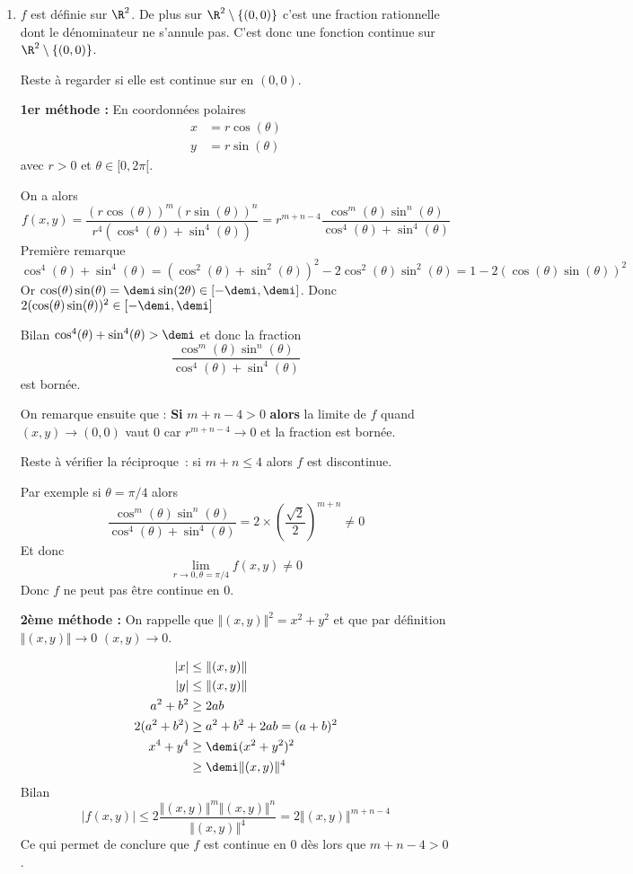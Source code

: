 \documentclass{article}
\begin{document}
\begin{enumerate}
\item $f$ est définie sur $\R^2$. De plus sur $\R^2 \setminus \{(0,0)\}$ c'est une fraction rationnelle dont le dénominateur ne s'annule pas. C'est donc une fonction continue sur $\R^2 \setminus \{(0,0)\}$.

Reste à regarder si elle est continue sur en $(0,0)$.

\textbf{1er méthode :} 
En coordonnées polaires
\begin{align*}
x &= r\cos(\theta)\\
y &= r\sin(\theta)
\end{align*}	
 avec $r>0$ et $\theta \in [0,2\pi[$.
 
On a alors
\[
f(x,y) = \dfrac{(r\cos(\theta))^m(r\sin(\theta))^n}{r^4(\cos^4(\theta)+\sin^4(\theta))}
= r^{m+n-4} \dfrac{\cos^m(\theta)\sin^n(\theta)}{\cos^4(\theta)+\sin^4(\theta)}
\]
Première remarque 
\[
\cos^4(\theta)+\sin^4(\theta) = (\cos^2(\theta) + \sin^2(\theta))^2 - 2\cos^2(\theta)\sin^2(\theta) = 1 - 2(\cos(\theta)\sin(\theta))^2
\]
Or $\cos(\theta)\sin(\theta) = \demi\sin(2\theta) \in [-\demi,\demi]$. Donc $2(\cos(\theta)\sin(\theta))^2 \in  [-\demi,\demi]$

Bilan $\cos^4(\theta)+\sin^4(\theta) > \demi$ et donc la fraction
\[
\dfrac{\cos^m(\theta)\sin^n(\theta)}{\cos^4(\theta)+\sin^4(\theta)}
\] 
est bornée.

On remarque ensuite que : \textbf{Si} $m+n-4 > 0$ \textbf{alors} la limite de $f$ quand $(x,y) \to (0,0)$ vaut $0$ car $r^{m+n-4} \to 0$ et la fraction est bornée.

Reste à vérifier la réciproque~: si $m+n \leq 4$ alors $f$ est discontinue.

Par exemple si $\theta = \pi/4$ alors  
\[
\dfrac{\cos^m(\theta)\sin^n(\theta)}{\cos^4(\theta)+\sin^4(\theta)} = 2 \times \left(\dfrac{\sqrt{2}}{2}\right)^{m+n} \neq 0
\]
Et donc 
\[
\underset{r\to 0, \theta = \pi/4}{\lim} f(x,y) \neq 0
\]
Donc $f$ ne peut pas être continue en $0$.


\textbf{2ème méthode :} On rappelle que $\Vert (x,y) \Vert^2 = x^2 + y^2$ et que par définition $\Vert (x,y) \Vert \to 0$ \ssi $(x,y) \to 0$.
 
 \begin{align*}
 |x| &\leq  \Vert (x,y) \Vert\\
 |y| &\leq  \Vert (x,y) \Vert\\
 a^2 + b^2 &\geq 2ab \\
 2(a^2+b^2) &\geq a^2 + b^2 + 2ab = (a+b)^2 \\
 x^4+ y^4 &\geq \demi (x^2 + y^2)^2\\
 				&\geq \demi \Vert (x,y) \Vert^4
 \end{align*}
 Bilan
 \[
\vert f(x,y) \vert  \leq 2\dfrac{\Vert (x,y) \Vert^m\Vert (x,y) \Vert^n}{\Vert (x,y) \Vert^4} = 2\Vert (x,y) \Vert^{m+n-4}
 \]
Ce qui permet de conclure que $f$ est continue en $0$ dès lors que $m+n-4 >0$.


\end{enumerate}
\end{document}
